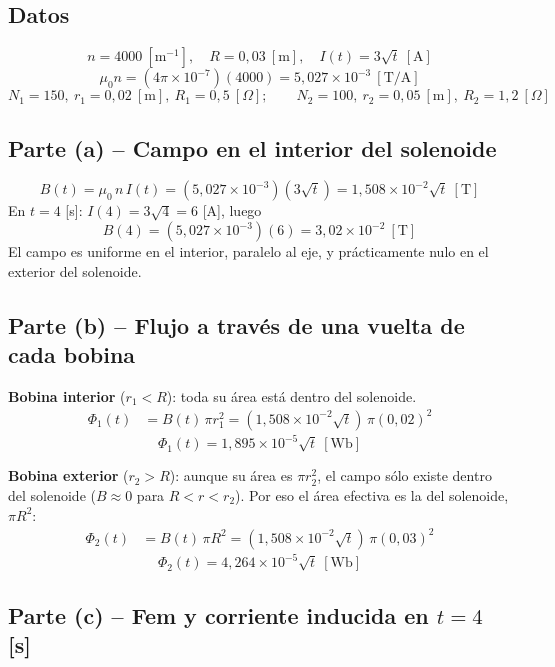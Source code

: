 \documentclass[12pt,letterpaper]{article}
\begin{document}
\subsection*{Datos}
\[
    n = 4000\ [\text{m}^{-1}],\quad R = 0{,}03\ [\text{m}],\quad I(t) = 3\sqrt{t}\ [\text{A}]
\]
\[
    \mu_0 n = (4\pi\times10^{-7})(4000) = 5{,}027\times10^{-3}\ [\text{T/A}]
\]
\[
    N_1 = 150,\ r_1 = 0{,}02\ [\text{m}],\ R_1 = 0{,}5\ [\Omega];\qquad
    N_2 = 100,\ r_2 = 0{,}05\ [\text{m}],\ R_2 = 1{,}2\ [\Omega]
\]

\subsection*{Parte (a) -- Campo en el interior del solenoide}
\[
    B(t) = \mu_0\,n\,I(t) = (5{,}027\times10^{-3})(3\sqrt{t}) = 1{,}508\times10^{-2}\sqrt{t}\ [\text{T}]
\]
En $t = 4$ [s]: $I(4) = 3\sqrt{4} = 6$ [A], luego
\[
    \boxed{B(4) = (5{,}027\times10^{-3})(6) = 3{,}02\times10^{-2}\ [\text{T}]}
\]
El campo es uniforme en el interior, paralelo al eje, y pr\'acticamente nulo en el exterior del
solenoide.

\subsection*{Parte (b) -- Flujo a trav\'es de una vuelta de cada bobina}

\noindent\textbf{Bobina interior} ($r_1 < R$): toda su \'area est\'a dentro del solenoide.
\begin{align*}
    \Phi_1(t) &= B(t)\,\pi r_1^2 = (1{,}508\times10^{-2}\sqrt{t})\,\pi(0{,}02)^2
\end{align*}
\[
    \boxed{\Phi_1(t) = 1{,}895\times10^{-5}\sqrt{t}\ [\text{Wb}]}
\]

\noindent\textbf{Bobina exterior} ($r_2 > R$): aunque su \'area es $\pi r_2^2$, el campo s\'olo existe
dentro del solenoide ($B\approx 0$ para $R < r < r_2$). Por eso el \'area efectiva es la del
solenoide, $\pi R^2$:
\begin{align*}
    \Phi_2(t) &= B(t)\,\pi R^2 = (1{,}508\times10^{-2}\sqrt{t})\,\pi(0{,}03)^2
\end{align*}
\[
    \boxed{\Phi_2(t) = 4{,}264\times10^{-5}\sqrt{t}\ [\text{Wb}]}
\]

\subsection*{Parte (c) -- Fem y corriente inducida en $t = 4$ [s]}
\end{document}
